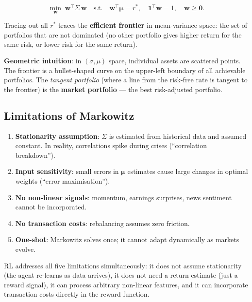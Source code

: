 \documentclass[12pt,a4paper]{article}
\begin{document}
\begin{equation}
  \min_{\mathbf{w}}\; \mathbf{w}^\top \Sigma\, \mathbf{w}
  \quad \text{s.t.}\quad
  \mathbf{w}^\top \boldsymbol{\mu} = r^*, \quad
  \mathbf{1}^\top \mathbf{w} = 1, \quad
  \mathbf{w} \ge \mathbf{0}.
  \label{eq:markowitz}
\end{equation}

Tracing out all $r^*$ traces the \textbf{efficient frontier} in
mean-variance space: the set of portfolios that are not dominated (no
other portfolio gives higher return for the same risk, or lower risk for
the same return).

\textbf{Geometric intuition}: in $(\sigma, \mu)$ space, individual assets
are scattered points.  The frontier is a bullet-shaped curve on the
upper-left boundary of all achievable portfolios.  The \emph{tangent
portfolio} (where a line from the risk-free rate is tangent to the
frontier) is the \textbf{market portfolio} --- the best risk-adjusted
portfolio.

\subsection{Limitations of Markowitz}

\begin{enumerate}
  \item \textbf{Stationarity assumption}: $\Sigma$ is estimated from
        historical data and assumed constant.  In reality, correlations
        spike during crises (``correlation breakdown'').
  \item \textbf{Input sensitivity}: small errors in $\boldsymbol{\mu}$
        estimates cause large changes in optimal weights
        (``error maximisation'').
  \item \textbf{No non-linear signals}: momentum, earnings surprises,
        news sentiment cannot be incorporated.
  \item \textbf{No transaction costs}: rebalancing assumes zero friction.
  \item \textbf{One-shot}: Markowitz solves once; it cannot adapt
        dynamically as markets evolve.
\end{enumerate}

\begin{finbox}
RL addresses all five limitations simultaneously: it does not assume
stationarity (the agent re-learns as data arrives), it does not need
a return estimate (just a reward signal), it can process arbitrary
non-linear features, and it can incorporate transaction costs directly
in the reward function.
\end{finbox}
\end{document}
